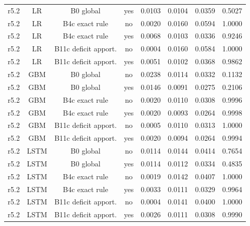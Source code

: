 \documentclass[10pt,onecolumn,letterpaper]{article}
\begin{document}
\begin{table}[!t]
{\begin{tabular}{lccccccc}
r5.2 & LR & B0 global & yes & 0.0103 & 0.0104 & 0.0359 & 0.5027 \\
r5.2 & LR & B4c exact rule & no & 0.0020 & 0.0160 & 0.0594 & 1.0000 \\
r5.2 & LR & B4c exact rule & yes & 0.0068 & 0.0103 & 0.0336 & 0.9246 \\
r5.2 & LR & B11c deficit apport. & no & 0.0004 & 0.0160 & 0.0584 & 1.0000 \\
r5.2 & LR & B11c deficit apport. & yes & 0.0051 & 0.0102 & 0.0368 & 0.9862 \\
r5.2 & GBM & B0 global & no & 0.0238 & 0.0114 & 0.0332 & 0.1132 \\
r5.2 & GBM & B0 global & yes & 0.0146 & 0.0091 & 0.0275 & 0.2106 \\
r5.2 & GBM & B4c exact rule & no & 0.0020 & 0.0110 & 0.0308 & 0.9996 \\
r5.2 & GBM & B4c exact rule & yes & 0.0020 & 0.0093 & 0.0264 & 0.9998 \\
r5.2 & GBM & B11c deficit apport. & no & 0.0005 & 0.0110 & 0.0313 & 1.0000 \\
r5.2 & GBM & B11c deficit apport. & yes & 0.0020 & 0.0094 & 0.0264 & 0.9994 \\
r5.2 & LSTM & B0 global & no & 0.0114 & 0.0144 & 0.0414 & 0.7654 \\
r5.2 & LSTM & B0 global & yes & 0.0114 & 0.0112 & 0.0334 & 0.4835 \\
r5.2 & LSTM & B4c exact rule & no & 0.0019 & 0.0142 & 0.0407 & 1.0000 \\
r5.2 & LSTM & B4c exact rule & yes & 0.0033 & 0.0111 & 0.0329 & 0.9964 \\
r5.2 & LSTM & B11c deficit apport. & no & 0.0004 & 0.0141 & 0.0400 & 1.0000 \\
r5.2 & LSTM & B11c deficit apport. & yes & 0.0026 & 0.0111 & 0.0308 & 0.9990 \\
\bottomrule
\end{tabular}}
\end{table}
\end{document}
